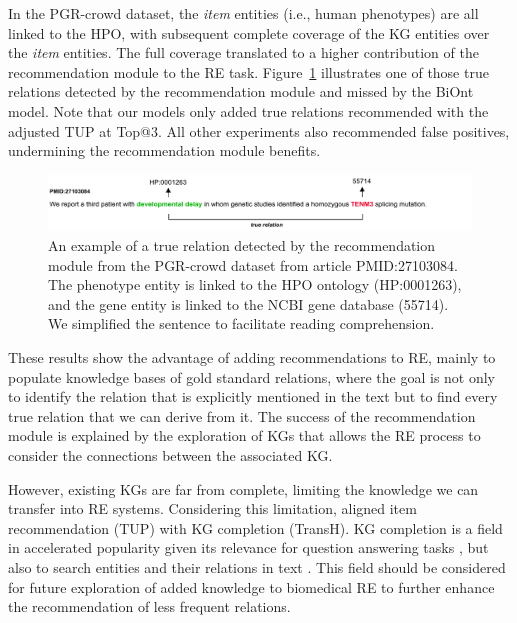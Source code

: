 In the PGR-crowd dataset, the \textit{item} entities (i.e., human phenotypes) are all linked to the HPO, with subsequent complete coverage of the KG entities over the \textit{item} entities. The full coverage translated to a higher contribution of the recommendation module to the RE task. Figure~\ref{fig:example_r} illustrates one of those true relations detected by the recommendation module and missed by the BiOnt model. Note that our models only added true relations recommended with the adjusted TUP at Top@3. All other experiments also recommended false positives, undermining the recommendation module benefits.

\begin{figure}[!h]
\centerline{\includegraphics[width=\linewidth]{images/chapter_4/example.pdf}}
\caption[An Example of a True Relation Detected by the Recommendation Module]{An example of a true relation detected by the recommendation module from the PGR-crowd dataset from article PMID:27103084. The phenotype entity is linked to the HPO ontology (HP:0001263), and the gene entity is linked to the NCBI gene database (55714). We simplified the sentence to facilitate reading comprehension.}
\label{fig:example_r}
\end{figure}

These results show the advantage of adding recommendations to RE, mainly to populate knowledge bases of gold standard relations, where the goal is not only to identify the relation that is explicitly mentioned in the text but to find every true relation that we can derive from it. The success of the recommendation module is explained by the exploration of KGs that allows the RE process to consider the connections between the associated KG.  

However, existing KGs are far from complete, limiting the knowledge we can transfer into RE systems. Considering this limitation, \cite{10.1145/3308558.3313705} aligned item recommendation (TUP) with KG completion (TransH). KG completion is a field in accelerated popularity given its relevance for question answering tasks \citep{10.1145/3132847.3132977,10.1145/3289600.3290956}, but also to search entities and their relations in text \citep{ji2020survey}. This field should be considered for future exploration of added knowledge to biomedical RE to further enhance the recommendation of less frequent relations.  


